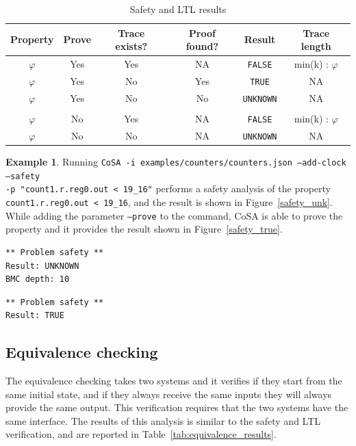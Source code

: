 \documentclass{article}
\theoremstyle{definition}
\newtheorem{example}{Example}[section]
\begin{document}
\begin{table}[h]
  \centering
\begin{tabular}{ c c c c | c c }
  Property & Prove & Trace exists? & Proof found? & Result & Trace length \\ \hline
  $\varphi$ & Yes & Yes & NA & \texttt{FALSE} & min(k) : $\varphi$  \\
  $\varphi$ & Yes & No & Yes & \texttt{TRUE} & NA  \\
  $\varphi$ & Yes & No & No & \texttt{UNKNOWN} & NA  \\ \\
  $\varphi$ & No & Yes & NA & \texttt{FALSE} & min(k) : $\varphi$  \\
  $\varphi$ & No & No & NA & \texttt{UNKNOWN} & NA  \\
\end{tabular}
\caption{Safety and LTL results}
\label{tab:safety_results}
\end{table}

\begin{example}
  Running \texttt{CoSA -i examples/counters/counters.json --add-clock
    --safety\\ -p "count1.r.reg0.out < 19\_16"} performs a safety
  analysis of the property \texttt{count1.r.reg0.out < 19\_16}, and
  the result is shown in Figure~\ref{safety_unk}. While adding the
  parameter \texttt{--prove} to the command, CoSA is able to prove the
  property and it provides the result shown in Figure~\ref{safety_true}.

\begin{lstlisting}[frame=single,language=ets,caption=Safety example (UNKNOWN),label=safety_unk]
** Problem safety **
Result: UNKNOWN
BMC depth: 10
\end{lstlisting}

\begin{lstlisting}[frame=single,language=ets,caption=Safety example (TRUE),label=safety_true]
** Problem safety **
Result: TRUE
\end{lstlisting}

\end{example}


\subsection{Equivalence checking}

The equivalence checking takes two systems and it verifies if they
start from the same initial state, and if they always receive the same
inputs they will always provide the same output. This verification
requires that the two systems have the same interface. The results of
this analysis is similar to the safety and LTL verification, and are
reported in Table~\ref{tab:equivalence_results}.
\end{document}
